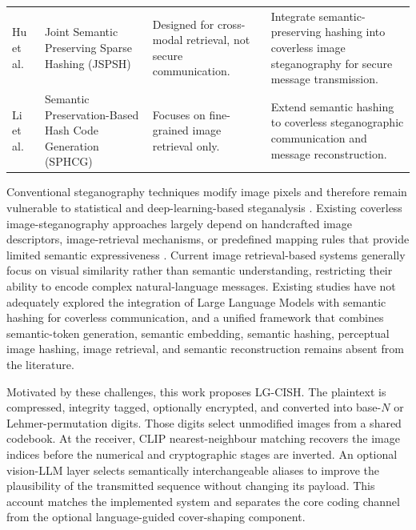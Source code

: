 \documentclass[10pt,a4paper]{article}
\theoremstyle{definition}
\begin{document}
\begin{table}[t]
\begin{tabular}{@{}p{2.15cm}p{2.55cm}p{4.05cm}p{4.25cm}@{}}
Hu et al.\ \cite{huJSPSH} & Joint Semantic Preserving Sparse Hashing (JSPSH) & Designed for cross-modal retrieval, not secure communication. & Integrate semantic-preserving hashing into coverless image steganography for secure message transmission. \\
Li et al.\ \cite{liSPHCG} & Semantic Preservation-Based Hash Code Generation (SPHCG) & Focuses on fine-grained image retrieval only. & Extend semantic hashing to coverless steganographic communication and message reconstruction. \\
\bottomrule
\end{tabular}
\end{table}

Conventional steganography techniques modify image pixels and therefore remain
vulnerable to statistical and deep-learning-based steganalysis \cite{mandal,mengReview,huJSPSH}. Existing
coverless image-steganography approaches largely depend on handcrafted image
descriptors, image-retrieval mechanisms, or predefined mapping rules that provide
limited semantic expressiveness \cite{kadhim,kheddar}. Current image retrieval-based systems
generally focus on visual similarity rather than semantic understanding, restricting
their ability to encode complex natural-language messages. Existing studies have not
adequately explored the integration of Large Language Models with semantic hashing
for coverless communication, and a unified framework that combines semantic-token
generation, semantic embedding, semantic hashing, perceptual image hashing, image
retrieval, and semantic reconstruction remains absent from the literature.

Motivated by these challenges, this work proposes LG-CISH. The plaintext is
compressed, integrity tagged, optionally encrypted, and converted into base-$N$ or
Lehmer-permutation digits. Those digits select unmodified images from a shared
codebook. At the receiver, CLIP nearest-neighbour matching recovers the image
indices before the numerical and cryptographic stages are inverted. An optional
vision-LLM layer selects semantically interchangeable aliases to improve the
plausibility of the transmitted sequence without changing its payload. This account
matches the implemented system and separates the core coding channel from the
optional language-guided cover-shaping component.
\end{document}
